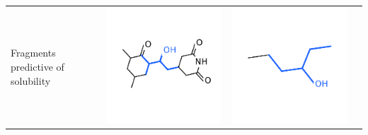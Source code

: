 \documentclass[landscape,a0b,final,a4resizeable]{include/a0poster}
\begin{document}
\begin{poster}
\begin{multicols}{3}
\vspace{-0.5in}
\begin{center}
\begin{tabular}{>{\centering}m{\mywidthb} >{\centering}m{\mywidtha} >{\centering}m{\mywidtha} >{\centering\arraybackslash}m{\mywidtha}}
Fragments predictive of solubility & 
\includegraphics[width=\mywidtha, clip, trim = 2mm 3mm 2mm 6mm]{figures/fig_5.pdf} &
\includegraphics[width=\mywidtha, clip, trim = 2mm 3mm 2mm 6mm]{figures/fig_6.pdf} &

\end{tabular}
\end{center}
\end{multicols}
\end{poster}
\end{document}
